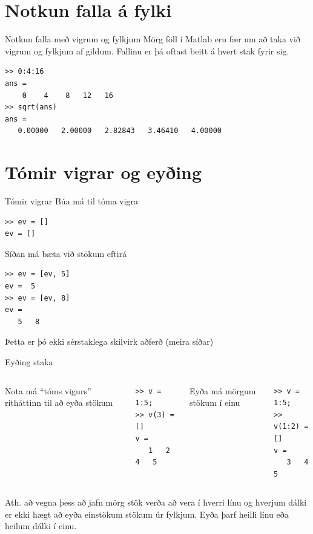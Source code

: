 \documentclass[handout]{beamer}
\begin{document}
\section{Notkun falla á fylki}

\begin{frame}[fragile]{Notkun falla með vigrum og fylkjum}
Mörg föll í Matlab eru fær um að taka við vigrum og fylkjum af gildum. Fallinu er þá oftast beitt á hvert stak fyrir sig.
\begin{verbatim}
>> 0:4:16
ans =
    0    4    8   12   16
>> sqrt(ans)
ans =
   0.00000   2.00000   2.82843   3.46410   4.00000
\end{verbatim}
\end{frame}

\section{Tómir vigrar og eyðing}

\begin{frame}[fragile]{Tómir vigrar}
Búa má til tóma vigra
\begin{verbatim}
>> ev = []
ev = []
\end{verbatim}
Síðan má bæta við stökum eftirá
\begin{verbatim}
>> ev = [ev, 5]
ev =  5
>> ev = [ev, 8]
ev =
   5   8
\end{verbatim}
Þetta er þó ekki sérstaklega skilvirk aðferð (meira síðar)
\end{frame}

\begin{frame}[fragile]{Eyðing staka}
\begin{columns}
Nota má ``tóms vigurs'' ritháttinn til að eyða stökum
\begin{verbatim}
>> v = 1:5;
>> v(3) = []
v =
   1   2   4   5

\end{verbatim}
Eyða má mörgum stökum í einu
\begin{verbatim}
>> v = 1:5;
>> v(1:2) = []
v =
   3   4   5
\end{verbatim}
\end{columns}
\vspace{\baselineskip}
Ath. að vegna þess að jafn mörg stök verða að vera í hverri línu og hverjum dálki er ekki hægt að eyða einstökum stökum úr fylkjum. Eyða þarf heilli línu eða heilum dálki í einu.
\end{frame}
\end{document}
